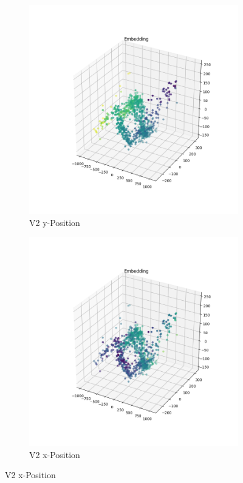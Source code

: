 \begin{figure}[h]
	\begin{subfigure}[c]{0.49\textwidth}			
		\includegraphics[width=1\textwidth,center]{bilder/Hauptteil/MT_Grapple/EMB_alle/2_Embedding_y.png}
		\caption{V2 y-Position}
		\label{img:Einbettung2_y}	
	\end{subfigure}
	\centering
	\begin{subfigure}[c]{0.49\textwidth}			
		\includegraphics[width=1\textwidth,center]{bilder/Hauptteil/MT_Grapple/EMB_alle/2_Embedding_x.png}
		\caption{V2 x-Position}
		\label{img:Einbettung2_x}		
	\end{subfigure}
	

\end{figure}
